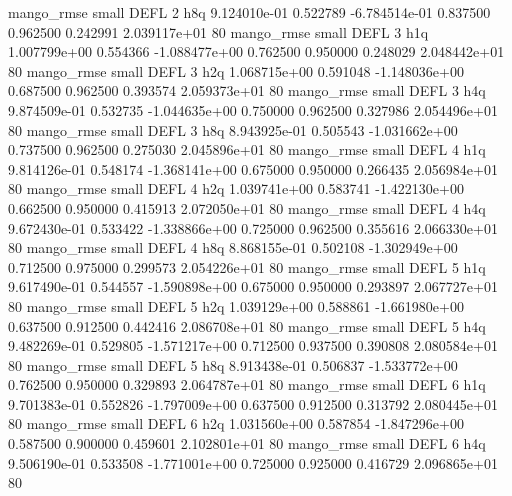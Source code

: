        mango_rmse      small     DEFL                 2                  h8q 9.124010e-01      0.522789 -6.784514e-01 0.837500 0.962500       0.242991 2.039117e+01 80
       mango_rmse      small     DEFL                 3                  h1q 1.007799e+00      0.554366 -1.088477e+00 0.762500 0.950000       0.248029 2.048442e+01 80
       mango_rmse      small     DEFL                 3                  h2q 1.068715e+00      0.591048 -1.148036e+00 0.687500 0.962500       0.393574 2.059373e+01 80
       mango_rmse      small     DEFL                 3                  h4q 9.874509e-01      0.532735 -1.044635e+00 0.750000 0.962500       0.327986 2.054496e+01 80
       mango_rmse      small     DEFL                 3                  h8q 8.943925e-01      0.505543 -1.031662e+00 0.737500 0.962500       0.275030 2.045896e+01 80
       mango_rmse      small     DEFL                 4                  h1q 9.814126e-01      0.548174 -1.368141e+00 0.675000 0.950000       0.266435 2.056984e+01 80
       mango_rmse      small     DEFL                 4                  h2q 1.039741e+00      0.583741 -1.422130e+00 0.662500 0.950000       0.415913 2.072050e+01 80
       mango_rmse      small     DEFL                 4                  h4q 9.672430e-01      0.533422 -1.338866e+00 0.725000 0.962500       0.355616 2.066330e+01 80
       mango_rmse      small     DEFL                 4                  h8q 8.868155e-01      0.502108 -1.302949e+00 0.712500 0.975000       0.299573 2.054226e+01 80
       mango_rmse      small     DEFL                 5                  h1q 9.617490e-01      0.544557 -1.590898e+00 0.675000 0.950000       0.293897 2.067727e+01 80
       mango_rmse      small     DEFL                 5                  h2q 1.039129e+00      0.588861 -1.661980e+00 0.637500 0.912500       0.442416 2.086708e+01 80
       mango_rmse      small     DEFL                 5                  h4q 9.482269e-01      0.529805 -1.571217e+00 0.712500 0.937500       0.390808 2.080584e+01 80
       mango_rmse      small     DEFL                 5                  h8q 8.913438e-01      0.506837 -1.533772e+00 0.762500 0.950000       0.329893 2.064787e+01 80
       mango_rmse      small     DEFL                 6                  h1q 9.701383e-01      0.552826 -1.797009e+00 0.637500 0.912500       0.313792 2.080445e+01 80
       mango_rmse      small     DEFL                 6                  h2q 1.031560e+00      0.587854 -1.847296e+00 0.587500 0.900000       0.459601 2.102801e+01 80
       mango_rmse      small     DEFL                 6                  h4q 9.506190e-01      0.533508 -1.771001e+00 0.725000 0.925000       0.416729 2.096865e+01 80
